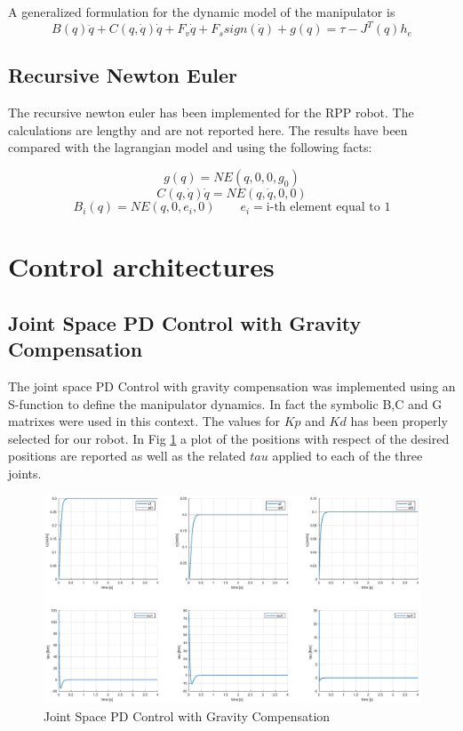 \documentclass[a4paper,12pt]{article}
\begin{document}
\noindent A generalized formulation for the dynamic model of the manipulator is
\[
    B(q)\ddot{q} + C(q, \dot{q})\dot{q} + F_v\dot{q} + F_ssign(\dot{q}) + g(q) = \tau - J^{T}(q)h_e  
\]
\subsection{Recursive Newton Euler}
The recursive newton euler has been implemented for the RPP robot. The calculations are lengthy and are not reported here. The results have been compared with the lagrangian model and using the following facts:

\[
    g(q) = NE(q,0,0,g_0)
\]
\[
    C(q,\dot{q})\dot{q} = NE(q,\dot{q},0,0)
\]
\[
    B_i(q) = NE(q,0,e_i,0) \qquad e_i = \text{i-th element equal to 1}
\]

\newpage 
\section{Control architectures}
\subsection{Joint Space PD Control with Gravity Compensation}

The joint space PD Control with gravity compensation was implemented using an S-function to define the manipulator dynamics. In fact the symbolic B,C and G matrixes were used in this context. The values for $Kp$ and $Kd$ has been properly selected for our robot. In Fig \ref{fig:gravity_comp} a plot of the positions with respect of the desired positions are reported as well as the related $tau$ applied to each of the three joints.
\begin{figure}[H]
    \begin{center}
        \hspace*{-4.5cm}
        \includegraphics[scale=0.5]{images/gravity_comp.eps}
    \end{center}
    \caption{Joint Space PD Control with Gravity Compensation}
    \label{fig:gravity_comp}
\end{figure}
\end{document}
